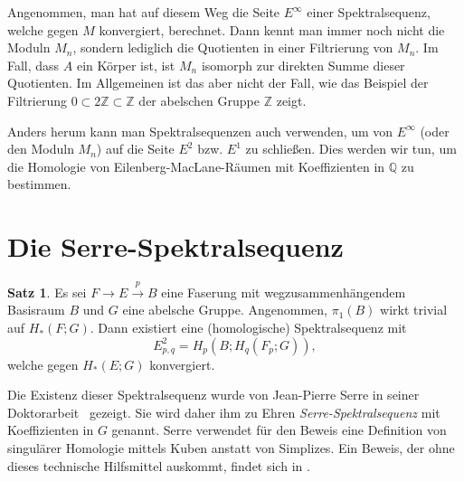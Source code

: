 \documentclass[11pt, a4paper, german]{article}
\theoremstyle{definition}
\newtheorem{satz}[lem]{Satz}
\theoremstyle{remark}
\newcommand{\Z}{\mathbb{Z}} %
\newcommand{\Q}{\mathbb{Q}} %
\begin{document}
Angenommen, man hat auf diesem Weg die Seite $E^\infty$ einer Spektralsequenz, welche gegen $M$ konvergiert, berechnet.
Dann kennt man immer noch nicht die Moduln $M_n$, sondern lediglich die Quotienten in einer Filtrierung von $M_n$.
Im Fall, dass $A$ ein Körper ist, ist $M_n$ isomorph zur direkten Summe dieser Quotienten.
Im Allgemeinen ist das aber nicht der Fall, wie das Beispiel der Filtrierung $0 \subset 2 \Z \subset \Z$ der abelschen Gruppe $\Z$ zeigt.

Anders herum kann man Spektralsequenzen auch verwenden, um von $E^\infty$ (oder den Moduln $M_n$) auf die Seite $E^2$ bzw. $E^1$ zu schließen.
Dies werden wir tun, um die Homologie von Eilenberg-MacLane-Räumen mit Koeffizienten in $\Q$ zu bestimmen.

\section{Die Serre-Spektralsequenz}

\begin{satz}
  Es sei $F \to E \xrightarrow{p} B$ eine Faserung mit wegzusammenhängendem Basisraum $B$ und $G$ eine abelsche Gruppe.
  Angenommen, $\pi_1(B)$ wirkt trivial auf $H_*(F; G)$.
  Dann existiert eine (homologische) Spektralsequenz mit
  \[ E^2_{p,q} = H_p(B; H_q(F_p; G)), \]
  welche gegen $H_*(E; G)$ konvergiert.
\end{satz}


Die Existenz dieser Spektralsequenz wurde von Jean-Pierre Serre in seiner Doktorarbeit~\cite{serre:thesis} gezeigt.
Sie wird daher ihm zu Ehren \emph{Serre-Spektralsequenz} mit Koeffizienten in $G$ genannt.
Serre verwendet für den Beweis eine Definition von singulärer Homologie mittels Kuben anstatt von Simplizes.
Ein Beweis, der ohne dieses technische Hilfsmittel auskommt, findet sich in \cite[Thm 1.3]{hatcher:ss}.
\end{document}

